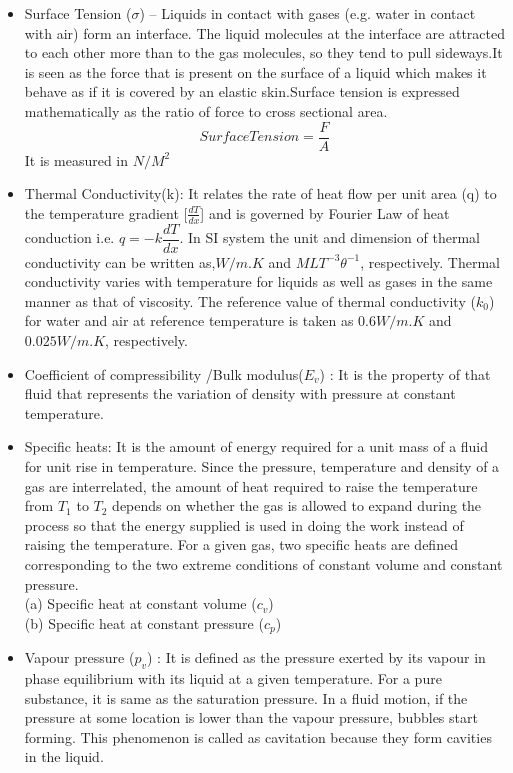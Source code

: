 \documentclass[a4paper,12pt]{report}
\begin{document}
{\begin{itemize}
$$\tau=\mu\frac{du}{dy}$$
where, $\frac{du}{dy}$ is the shear strain rate and $\mu$ is the dynamic(or absolute) viscosity of the fluid.\\
In general,the viscosity of a fluid mainly depends on temperature.For liquids,the viscosity decreases with temperature and for gases,it increases with temperature. Its SI units are $kgm^{-1}s^{-1}$ or $Pas$.
\item Surface Tension ($\sigma$) – Liquids in contact with gases (e.g. water in contact with air) form an interface. The liquid molecules at the interface are attracted to each other more than to the gas molecules, so they tend to pull sideways.It is seen as the force that is present on the surface of a liquid which makes it behave as if it is covered by an elastic skin.Surface tension is expressed mathematically as the ratio of force to cross sectional area.
$$ Surface Tension = \frac{F}{A}$$
It is measured in $N/M^2$
\item Thermal Conductivity(k): It relates the rate of heat flow per unit area (q) to the temperature gradient [$\frac{dT}{dx}$] and is governed by Fourier Law of heat conduction i.e. 
 $q=-k \dfrac{dT}{dx}$.
 In SI system the unit and dimension of thermal conductivity can be written as,$W/m.K$ and $MLT^{-3}\theta^{-1}$, respectively. Thermal conductivity varies with temperature for liquids as well as gases in the same manner as that of viscosity. The reference value of thermal conductivity ($k_0$) for water and air at reference temperature is taken as $0.6 W/m.K$ and $0.025 W/m.K$, respectively. 
 \item Coefficient of compressibility /Bulk modulus($E_v$) : It is the property of that fluid that represents the variation of density with pressure at constant temperature.
\item Specific heats: It is the amount of energy required for a unit mass of a fluid for unit rise in temperature. Since the pressure, temperature and density of a gas are interrelated, the amount of heat required to raise the temperature from $T_1$ to $T_2$ depends on whether the gas is allowed to expand during the process so that the energy supplied is used in doing the work instead of raising the temperature. For a given gas, two specific heats are defined corresponding to the two extreme conditions of constant volume and constant pressure.\\
(a) Specific heat at constant volume ($c_v$)\\
(b) Specific heat at constant pressure ($c_p$)
\item Vapour pressure ($p_v$) : It is defined as the pressure exerted by its vapour in phase equilibrium with its liquid at a given temperature. For a pure substance, it is same as the saturation pressure. In a fluid motion, if the pressure at some location is lower than the vapour pressure, bubbles start forming. This phenomenon is called as cavitation because they form cavities in the liquid.
\end{itemize}
}
\end{document}
